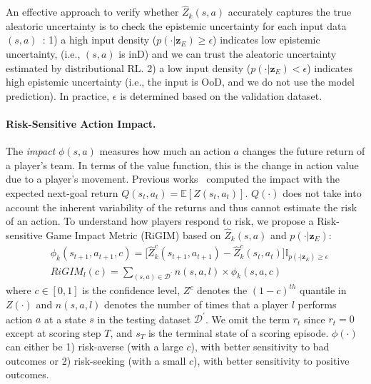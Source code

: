 \documentclass[letterpaper]{article} %
\newcommand{\condition}{\boldsymbol{z}_{E}}
\newcommand{\state}{s}
\newcommand{\action}{a}
\newcommand{\reward}{r}
\newcommand{\agentIndex}{k}
\newcommand{\dataset}{\mathcal{D}}
\newcommand{\expect}{\mathbb{E}}
\newcommand{\confidence}{c}
\newcommand{\impact}{\phi}
\newcommand{\playerId}{l}
\newcommand{\sys}{RiGIM}
\newcommand{\system}{\sys\;}
\begin{document}
An effective approach to verify whether $\hat{Z}_{\agentIndex}(\state,\action)$ accurately captures the true aleatoric uncertainty is to check the epistemic uncertainty for each input data $(\state,\action)$~\cite{Mukhoti2021Uncertainty}: 1) a high input density ($p(\cdot|\condition)\geq\epsilon$) indicates low epistemic uncertainty,
(i.e., $(\state,\action)$ is inD)
and we can trust the aleatoric uncertainty estimated by distributional RL. 2) a low input density ($p(\cdot|\condition)<\epsilon$) indicates high epistemic uncertainty (i.e., the input is OoD, and we do not use the model prediction). In practice, $\epsilon$ is determined based on the validation dataset.

\paragraph{Risk-Sensitive Action Impact.}
The {\it impact} $\impact(\state,\action)$ measures how much an action $\action$ changes the future return of a player's team. In terms of the value function, this is the change in action value due to a player’s movement. 
Previous works~\cite{Routley2015Markov,Liu2018DRL,Decroos2019Actions} computed the impact with the expected next-goal return $Q(\state_{t},\action_{t})=\expect[Z(\state_{t},\action_{t})]$. $Q(\cdot)$ does not take into account the inherent variability of the returns and thus cannot estimate the risk of an action. 
To understand how players respond to risk, we propose a Risk-sensitive Game Impact Metric (\system) based on $\hat{Z}_{\agentIndex}(\state,\action)$ and $p(\cdot|\condition)$:
\begin{align}
    &\impact_{\agentIndex}(\state_{t+1},\action_{t+1},\confidence)=\big[\hat{Z}^{\confidence}_{\agentIndex}(\state_{t+1},\action_{t+1})-
    \hat{Z}^{\confidence}_{\agentIndex}(\state_{t},\action_{t})\big]\mathbb{I}_{p(\cdot|\condition)\geq\epsilon}
    \nonumber\\
    &\sys_{\playerId}(\confidence)=\sum_{(\state,\action)\in\dataset^{\prime}}n(\state,\action,\playerId)\times\impact_{\agentIndex}(\state,\action,\confidence)\label{eqn:RIGIM}
\end{align}
where $\confidence\in[0,1]$ is the confidence level, $Z^{\confidence}$ denotes the $(1-\confidence)^{th}$ quantile in $Z(\cdot)$ and $n(\state,\action,\playerId)$ denotes the number of times that a player $\playerId$ performs action $\action$ at a state $\state$ in the testing dataset $\dataset^{\prime}$. We omit the term $\reward_t$ since $\reward_{t}=0$ except at scoring step $T$, and $\state_{T}$ is the terminal state of a scoring episode.
$\impact(\cdot)$ can either be 1) risk-averse (with a large $\confidence$), with better sensitivity to bad outcomes or 2) risk-seeking (with a small $\confidence$), with better sensitivity to positive outcomes. 
\end{document}
